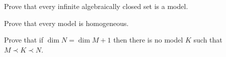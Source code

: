 \begin{exercise}\label{ex_infinite_acl}
Prove that every infinite algebraically closed set is a model.\QED
\end{exercise}

\begin{exercise}
Prove that every model is homogeneous.\QED 
\end{exercise}

\begin{exercise}
Prove that if $\dim N=\dim M+1$ then there is no model $K$ such that $M\prec K\prec N$.\QED 
\end{exercise}




% 

